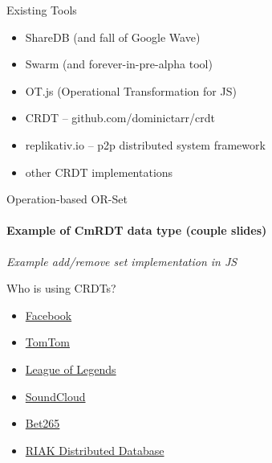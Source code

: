 \documentclass{beamer}
\begin{document}


\begin{frame}{Existing Tools}

\begin{itemize}
  \item ShareDB (and fall of Google Wave)
  \item Swarm (and forever-in-pre-alpha tool)
  \item OT.js (Operational Transformation for JS)
  \item CRDT – github.com/dominictarr/crdt
  \item replikativ.io – p2p distributed system framework
  \item other CRDT implementations
\end{itemize}

\end{frame}


\begin{frame}{Operation-based OR-Set}
\framesubtitle{Example of CmRDT data type (couple slides)}
\textit{Example add/remove set implementation in JS}
\end{frame}


\begin{frame}{Who is using CRDTs?}
\begin{itemize}
	\item \href{https://dzone.com/articles/facebook-announces-apollo-qcon}{Facebook}
	\item \href{https://speakerdeck.com/ajantis/practical-demystification-of-crdts}{TomTom}
	\item \href{http://highscalability.com/blog/2014/10/13/how-league-of-legends-scaled-chat-to-70-million-players-it-t.html}{League of Legends}
	\item \href{https://developers.soundcloud.com/blog/roshi-a-crdt-system-for-timestamped-events}{SoundCloud}
	\item \href{http://www.erlang-factory.com/static/upload/media/1434558446558020erlanguserconference2015bet365michaelowen.pdf}{Bet265}
	\item \href{http://docs.basho.com/riak/kv/2.2.3/developing/data-types/}{RIAK Distributed Database}
\end{itemize}
\end{frame}
\end{document}
